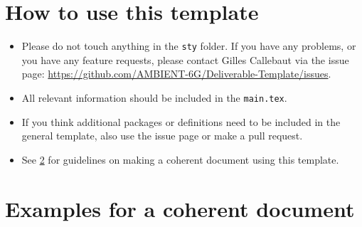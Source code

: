 \chapter{How to use this template}

\begin{itemize}
    \item Please do not touch anything in the \texttt{sty} folder. If you have any problems, or you have any feature requests, please contact Gilles Callebaut via the issue page: \url{https://github.com/AMBIENT-6G/Deliverable-Template/issues}.
    \item All relevant information should be included in the \texttt{main.tex}.
    \item If you think additional packages or definitions need to be included in the general template, also use the issue page or make a pull request.

    \item See \cref{ch:deliverable-guidelines} for guidelines on making a coherent document using this template.
\end{itemize}


\chapter{Examples for a coherent document}\label{ch:deliverable-guidelines}


